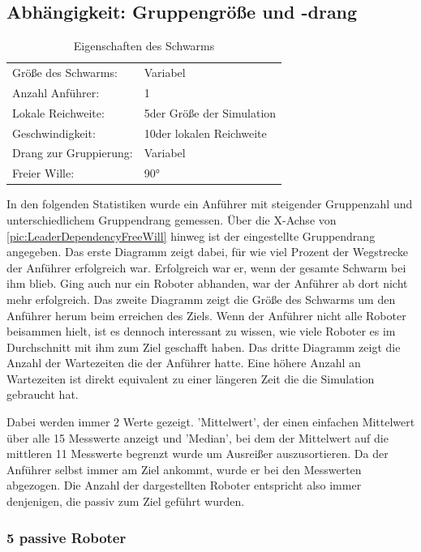 \subsection*{Abhängigkeit: Gruppengröße und -drang}

\begin{table}[h]
	\caption{Eigenschaften des Schwarms}
	\begin{tabular}{ll}
		Größe des Schwarms:		& Variabel \\
		Anzahl Anführer:		& 1 \\
		Lokale Reichweite:		& 5\per der Größe der Simulation \\
		Geschwindigkeit:		& 10\per der lokalen Reichweite \\
		Drang zur Gruppierung:	& Variabel \\
		Freier Wille:			& 90° \\
	\end{tabular}
\end{table}

In den folgenden Statistiken wurde ein Anführer mit steigender Gruppenzahl und unterschiedlichem Gruppendrang gemessen. Über die X-Achse von \autoref{pic:LeaderDependencyFreeWill} hinweg ist der eingestellte Gruppendrang angegeben.
Das erste Diagramm zeigt dabei, für wie viel Prozent der Wegstrecke der Anführer erfolgreich war. Erfolgreich war er, wenn der gesamte Schwarm bei ihm blieb. Ging auch nur ein Roboter abhanden, war der Anführer ab dort nicht mehr erfolgreich.
Das zweite Diagramm zeigt die Größe des Schwarms um den Anführer herum beim erreichen des Ziels. Wenn der Anführer nicht alle Roboter beisammen hielt, ist es dennoch interessant zu wissen, wie viele Roboter es im Durchschnitt mit ihm zum Ziel geschafft haben.
Das dritte Diagramm zeigt die Anzahl der Wartezeiten die der Anführer hatte. Eine höhere Anzahl an Wartezeiten ist direkt equivalent zu einer längeren Zeit die die Simulation gebraucht hat.

Dabei werden immer 2 Werte gezeigt. 'Mittelwert', der einen einfachen Mittelwert über alle 15 Messwerte anzeigt und 'Median', bei dem der Mittelwert auf die mittleren 11 Messwerte begrenzt wurde um Ausreißer auszusortieren. Da der Anführer selbst immer am Ziel ankommt, wurde er bei den Messwerten abgezogen. Die Anzahl der dargestellten Roboter entspricht also immer denjenigen, die passiv zum Ziel geführt wurden.

\subsubsection*{5 passive Roboter}


